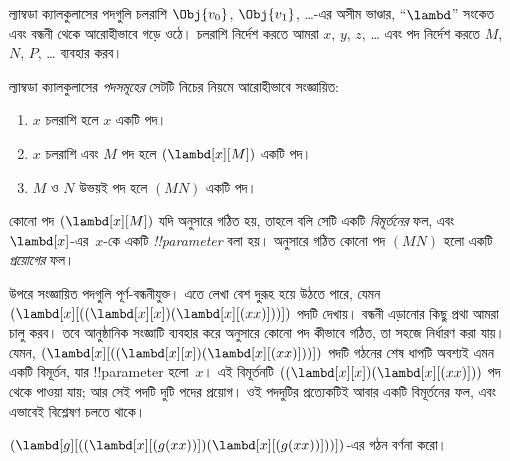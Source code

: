 \documentclass[../../../include/open-logic-section]{subfiles}
\begin{document}

ল্যাম্বডা ক্যালকুলাসের পদগুলি চলরাশি $\Obj{v_0}$, $\Obj{v_1}$, \dots-এর
অসীম ভাণ্ডার, ``$\lambd$'' সংকেত এবং বন্ধনী থেকে আরোহীভাবে গড়ে ওঠে।
চলরাশি নির্দেশ করতে আমরা $x$, $y$, $z$, \dots{} এবং পদ নির্দেশ করতে
$M$, $N$, $P$, \dots{} ব্যবহার করব।

\begin{defn}[পদ] 
ল্যাম্বডা ক্যালকুলাসের \emph{পদসমূহের} সেটটি নিচের নিয়মে আরোহীভাবে
সংজ্ঞায়িত:
\begin{enumerate}
  \item {} $x$ চলরাশি হলে $x$ একটি পদ।
  \item {} $x$ চলরাশি এবং $M$ পদ হলে
    $(\lambd[x][M])$ একটি পদ।
  \item {} $M$ ও $N$ উভয়ই পদ হলে $(MN)$ একটি পদ।
\end{enumerate}
\end{defn}

কোনো পদ $(\lambd[x][M])$ যদি  অনুসারে গঠিত হয়,
তাহলে বলি সেটি একটি \emph{বিমূর্তনের} ফল, এবং $\lambd[x]$-এর~$x$-কে
একটি \emph{!!{parameter}} বলা হয়।  অনুসারে গঠিত
কোনো পদ $(MN)$ হলো একটি \emph{প্রয়োগের} ফল।

উপরে সংজ্ঞায়িত পদগুলি পূর্ণ-বন্ধনীযুক্ত। এতে লেখা বেশ দুরূহ হয়ে উঠতে
পারে, যেমন $(\lambd[x][((\lambd[x][x])(\lambd[x][(xx)]))])$ পদটি দেখায়।
বন্ধনী এড়ানোর কিছু প্রথা আমরা চালু করব। তবে আনুষ্ঠানিক সংজ্ঞাটি ব্যবহার
করে  অনুসারে কোনো পদ কীভাবে গঠিত, তা সহজে নির্ধারণ করা
যায়। যেমন, $(\lambd[x][((\lambd[x][x])(\lambd[x][(xx)]))])$ পদটি
গঠনের শেষ ধাপটি অবশ্যই এমন একটি বিমূর্তন, যার !!{parameter} হলো~$x$।
এই বিমূর্তনটি $((\lambd[x][x])(\lambd[x][(xx)]))$ পদ থেকে পাওয়া যায়;
আর সেই পদটি দুটি পদের প্রয়োগ। ওই পদদুটির প্রত্যেকটিই আবার একটি
বিমূর্তনের ফল, এবং এভাবেই বিশ্লেষণ চলতে থাকে।

\begin{prob}
$(\lambd[g][((\lambd[x][(g (x x))])
  (\lambd[x][(g (x x))]))])$-এর গঠন বর্ণনা করো।
\end{prob}
\end{document}
